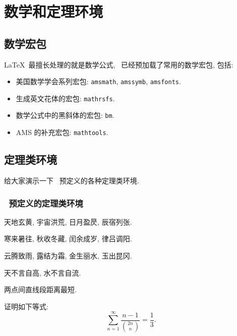 \chapter{数学和定理环境}
\label{cha:theorem}
\section{数学宏包}
\LaTeX\ 最擅长处理的就是数学公式, \shuthesis\ 已经预加载了常用的数学宏包, 包括:
\begin{itemize}
\item 美国数学学会系列宏包: \texttt{amsmath}, \texttt{amssymb}, \texttt{amsfonts}.
\item 生成英文花体的宏包: \texttt{mathrsfs}.
\item 数学公式中的黑斜体的宏包: \texttt{bm}.
\item AMS 的补充宏包: \texttt{mathtools}.
\end{itemize}

\section{定理类环境}
给大家演示一下 \shuthesis\ 预定义的各种定理类环境.

\subsection{\shuthesis\ 预定义的定理类环境}
\begin{assumption}
天地玄黄, 宇宙洪荒, 日月盈昃, 辰宿列张.
\end{assumption}

\begin{definition}
寒来暑往, 秋收冬藏, 闰余成岁, 律吕调阳.
\end{definition}

\begin{proposition}
云腾致雨, 露结为霜, 金生丽水, 玉出昆冈.
\end{proposition}

\begin{remark}
天不言自高, 水不言自流.
\end{remark}

\begin{axiom}
两点间直线段距离最短.  
\end{axiom}

\begin{lemma}
证明如下等式:
\[
\sum_{n=1}^{\infty}\frac{n-1}{\binom{2n}{n}}=\frac{1}{3}.
\]
\end{lemma}

